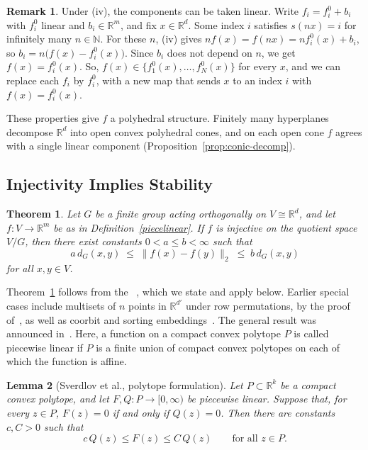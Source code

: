 \documentclass[11pt]{article}
\newcommand{\R}{\mathbb{R}}
\newtheorem{theor}{Theorem}[section]
\newtheorem{lem}[theor]{Lemma}
\theoremstyle{definition}
\newtheorem*{rem*}{Remark}
\begin{document}
	\begin{rem*}
		Under (iv), the components can be taken linear. Write $f_i=f_i^{0}+b_i$ with
		$f_i^{0}$ linear and $b_i\in\R^m$, and fix $x\in\R^d$. Some index $i$ satisfies $s(nx)=i$
		for infinitely many $n\in\mathbb N$. For these $n$, (iv) gives
		$nf(x)=f(nx)=nf_i^{0}(x)+b_i$, so $b_i=n\bigl(f(x)-f_i^{0}(x)\bigr)$. Since $b_i$ does not
		depend on $n$, we get $f(x)=f_i^{0}(x)$. So, $f(x)\in\{f_1^{0}(x),\dots,f_N^{0}(x)\}$
		for every $x$, and we can replace each $f_i$ by $f_i^{0}$, with a new map that
		sends $x$ to an index $i$ with $f(x)=f_i^{0}(x)$.
	\end{rem*}



	These properties give $f$ a polyhedral structure. Finitely many hyperplanes
	decompose $\R^d$ into open convex polyhedral cones, and on each open cone $f$ agrees
	with a single linear component (Proposition~\ref{prop:conic-decomp}).

	\subsection*{Injectivity Implies Stability}

	\begin{theor}\label{thm:main}
		Let $G$ be a finite group acting orthogonally on $V \cong \R^d$, and let
		$f \colon V \to \R^m$ be as in Definition~\ref{piecelinear}. If $f$ is injective
		on the quotient space $V/G$, then there exist constants $0 < a \leq b < \infty$
		such that
		\[
		a\,d_G(x,y) \;\leq\; \|f(x) - f(y)\|_2 \;\leq\; b\,d_G(x,y)
		\]
		for all $x, y \in V$.
	\end{theor}

	Theorem~\ref{thm:main} follows from the ~\cite[Lem.~3.4]{sverdlov2024fsw}, which we state and apply below. Earlier special cases include multisets of \(n\) points in \(\R^{d'}\) under row permutations, by the proof of~\cite[Thm.~4.2]{amir2025fourier}, as well as coorbit and sorting embeddings~\cite{balan2023stab,balan2025permutation,balan2024sorting}. The general result was announced in~\cite{freeman2024stability}. Here, a function on a compact convex polytope \(P\) is called piecewise linear if \(P\) is a finite union of compact convex polytopes on each of which the function is affine.

\begin{lem}[Sverdlov et al., polytope formulation]
	\label{lem:sdda}
	Let $P\subset\R^k$ be a compact convex polytope, and let
	$F,Q\colon P\to[0,\infty)$ be piecewise linear. Suppose that,
	for every $z\in P$, $F(z)=0$ if and only if $Q(z)=0$.
	Then there are constants $c,C>0$ such that
	\[
	c\,Q(z)\le F(z)\le C\,Q(z)
	\qquad\text{for all }z\in P.
	\]
\end{lem}
\end{document}
